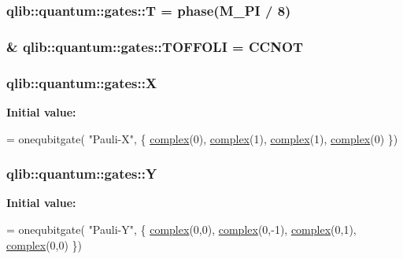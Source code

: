 \subsubsection[{\texorpdfstring{T}{T}}]{ qlib\+::quantum\+::gates\+::T = {\bf phase}({\bf M\+\_\+\+PI} / 8)}\hypertarget{namespaceqlib_1_1quantum_1_1gates_a9b72e189dcf40679247251dff199887d}{}\label{namespaceqlib_1_1quantum_1_1gates_a9b72e189dcf40679247251dff199887d}
\subsubsection[{\texorpdfstring{T\+O\+F\+F\+O\+LI}{TOFFOLI}}]{\& qlib\+::quantum\+::gates\+::\+T\+O\+F\+F\+O\+LI = {\bf C\+C\+N\+OT}}\hypertarget{namespaceqlib_1_1quantum_1_1gates_a824d430d591160d7bd3237928d56570b}{}\label{namespaceqlib_1_1quantum_1_1gates_a824d430d591160d7bd3237928d56570b}
\subsubsection[{\texorpdfstring{X}{X}}]{ qlib\+::quantum\+::gates\+::X}\hypertarget{namespaceqlib_1_1quantum_1_1gates_af56c4617497a46f091c27f7f4bc65ed5}{}\label{namespaceqlib_1_1quantum_1_1gates_af56c4617497a46f091c27f7f4bc65ed5}
{\bfseries Initial value\+:}
\begin{DoxyCode}
= onequbitgate(
    \textcolor{stringliteral}{"Pauli-X"}, 
    \{
        \hyperlink{classqlib_1_1math_1_1complex}{complex}(0), \hyperlink{classqlib_1_1math_1_1complex}{complex}(1),
        \hyperlink{classqlib_1_1math_1_1complex}{complex}(1), \hyperlink{classqlib_1_1math_1_1complex}{complex}(0)
    \})
\end{DoxyCode}
\subsubsection[{\texorpdfstring{Y}{Y}}]{ qlib\+::quantum\+::gates\+::Y}\hypertarget{namespaceqlib_1_1quantum_1_1gates_a7d495b8ebaa4b3a3f73a871bc993e82b}{}\label{namespaceqlib_1_1quantum_1_1gates_a7d495b8ebaa4b3a3f73a871bc993e82b}
{\bfseries Initial value\+:}
\begin{DoxyCode}
= onequbitgate(
    \textcolor{stringliteral}{"Pauli-Y"}, 
    \{
        \hyperlink{classqlib_1_1math_1_1complex}{complex}(0,0), \hyperlink{classqlib_1_1math_1_1complex}{complex}(0,-1),
        \hyperlink{classqlib_1_1math_1_1complex}{complex}(0,1), \hyperlink{classqlib_1_1math_1_1complex}{complex}(0,0)
    \})
\end{DoxyCode}
